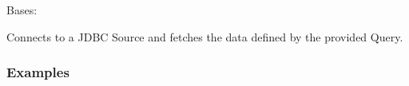 \documentclass[a4paper,10pt, twoside,english]{sphinxmanual}
\begin{document}

\begin{fulllineitems}
\label{\detokenize{extractor/jdbc:spooq2.extractor.jdbc.JDBCExtractorFullLoad}}
Bases: {\hyperref[\detokenize{extractor/jdbc:spooq2.extractor.jdbc.JDBCExtractor}]{}}

Connects to a JDBC Source and fetches the data defined by the provided Query.
\subsubsection*{Examples}


\end{fulllineitems}
\end{document}
